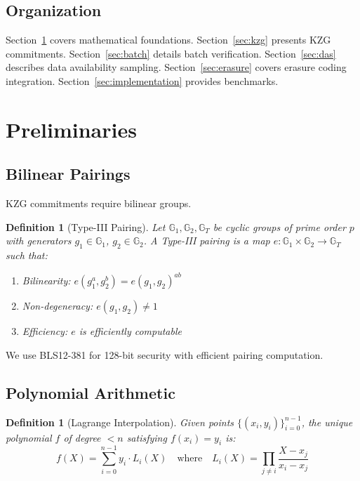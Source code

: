 \documentclass[11pt,a4paper]{article}
\newtheorem{definition}[theorem]{Definition}
\newcommand{\G}{\mathbb{G}}
\begin{document}
\subsection{Organization}

Section~\ref{sec:preliminaries} covers mathematical foundations. Section~\ref{sec:kzg} presents KZG commitments. Section~\ref{sec:batch} details batch verification. Section~\ref{sec:das} describes data availability sampling. Section~\ref{sec:erasure} covers erasure coding integration. Section~\ref{sec:implementation} provides benchmarks.

\section{Preliminaries}
\label{sec:preliminaries}

\subsection{Bilinear Pairings}

KZG commitments require bilinear groups.

\begin{definition}[Type-III Pairing]
Let $\G_1, \G_2, \G_T$ be cyclic groups of prime order $p$ with generators $g_1 \in \G_1$, $g_2 \in \G_2$. A Type-III pairing is a map $e: \G_1 \times \G_2 \to \G_T$ such that:
\begin{enumerate}[label=(\roman*)]
    \item Bilinearity: $e(g_1^a, g_2^b) = e(g_1, g_2)^{ab}$
    \item Non-degeneracy: $e(g_1, g_2) \neq 1$
    \item Efficiency: $e$ is efficiently computable
\end{enumerate}
\end{definition}

We use BLS12-381 for 128-bit security with efficient pairing computation.

\subsection{Polynomial Arithmetic}

\begin{definition}[Lagrange Interpolation]
Given points $\{(x_i, y_i)\}_{i=0}^{n-1}$, the unique polynomial $f$ of degree $< n$ satisfying $f(x_i) = y_i$ is:
\[
f(X) = \sum_{i=0}^{n-1} y_i \cdot L_i(X) \quad \text{where} \quad L_i(X) = \prod_{j \neq i} \frac{X - x_j}{x_i - x_j}
\]
\end{definition}
\end{document}
